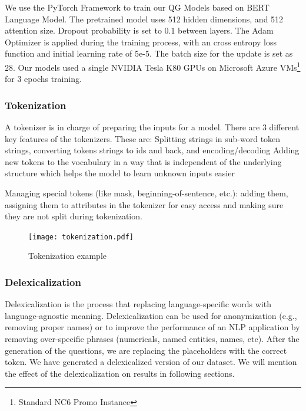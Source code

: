 \documentclass{mefsdp}
\begin{document}

	We use the PyTorch Framework to train our QG Models based on BERT Language Model. The pretrained model uses 512 hidden dimensions, and 512 attention size. Dropout probability is set to 0.1 between layers. The Adam Optimizer is applied during the training process, with an cross entropy loss function and initial learning rate of 5e-5. The batch size for the update is set as 28. Our models used a single NVIDIA Tesla K80 GPUs on Microsoft Azure VMs\footnote{Standard NC6 Promo Instance} for 3 epochs training. 
	\subsubsection{Tokenization}
	A tokenizer is in charge of preparing the inputs for a model. There are 3 different key features of the tokenizers. These are:
	Splitting strings in sub-word token strings, converting tokens strings to ids and back, and encoding/decoding
	Adding new tokens to the vocabulary in a way that is independent of the underlying structure which helps the model to learn unknown inputs easier
	
	Managing special tokens (like mask, beginning-of-sentence, etc.): adding them, assigning them to attributes in the tokenizer for easy access and making sure they are not split during tokenization.
	
	\begin{figure}[h!]
		\centering
		\texttt{[image: tokenization.pdf]}
		\caption{Tokenization example\label{token}}
	\end{figure}
	
	\subsubsection{Delexicalization}
	Delexicalization is the process that replacing language-specific words with language-agnostic meaning. Delexicalization can be used for anonymization (e.g., removing proper names) or to improve the performance of an NLP application by removing over-specific phrases (numericals, named entities, names, etc). After the generation of the questions, we are replacing the placeholders with the correct token. We have generated a delexicalized version of our dataset. We will mention the effect of the delexicalization on results in following sections.
	
\end{document}
